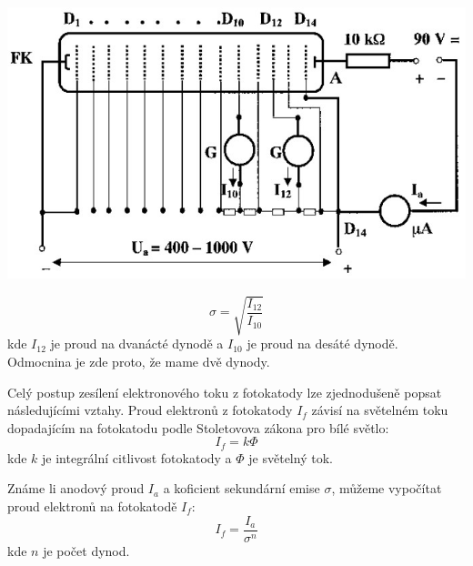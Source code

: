 \documentclass[a4paper,11pt]{article}
\begin{document}
    \begin{minipage}[t]{0.5\textwidth} 
                \vspace{10pt}   
                \par \centering
                \includegraphics[scale=0.45]{scheme}
                \captionsetup{justification=centering, font=footnotesize}
                \label{fig:scheme}
                \vspace{10pt}
                \raggedright   

                \begin{equation}
                    \sigma = \sqrt{\frac{I_{12}}{I_{10}}}
                \end{equation}
                kde $I_{12}$ je proud na dvanácté dynodě a $I_{10}$ je proud na desáté dynodě. Odmocnina je zde proto, že mame dvě dynody.

                \par Celý postup zesílení elektronového toku z fotokatody lze zjednodušeně popsat následujícími vztahy. Proud elektronů z fotokatody $I_f$ závisí na světelném toku dopadajícím na fotokatodu podle Stoletovova zákona pro bílé světlo:
                \begin{equation}
                    I_f = k \Phi
                \end{equation}
                kde $k$ je integrální citlivost fotokatody a $\Phi$ je světelný tok.

                \par Známe li anodový proud $I_a$ a koficient sekundární emise $\sigma$, můžeme vypočítat proud elektronů na fotokatodě $I_f$:
                \begin{equation}
                    I_f = \frac{I_a}{\sigma^n}
                \end{equation}
                kde $n$ je počet dynod.
    \end{minipage}
\end{document}
